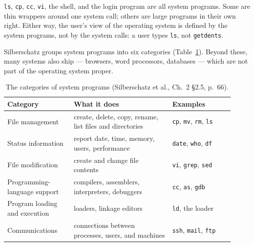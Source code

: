 \documentclass[11pt]{article}
\begin{document}
\texttt{ls}, \texttt{cp}, \texttt{cc}, \texttt{vi}, the shell, and the login
program are all system programs. Some are thin wrappers around one system
call; others are large programs in their own right. Either way, the user's view
of the operating system is defined by the system programs, not by the system
calls: a user types \texttt{ls}, not \texttt{getdents}.

Silberschatz groups system programs into six categories
(Table~\ref{tab:sysprog}). Beyond these, many systems also ship
 --- browsers, word processors, databases --- which
are not part of the operating system proper.

\begin{table}[h]
\centering
\small
\renewcommand{\arraystretch}{1.3}
\begin{tabular}{@{}>{\raggedright\arraybackslash}p{0.27\linewidth}>{\raggedright\arraybackslash}p{0.40\linewidth}>{\raggedright\arraybackslash}p{0.25\linewidth}@{}}
\toprule
\textbf{Category} & \textbf{What it does} & \textbf{Examples} \\
\midrule
File management & create, delete, copy, rename, list files and directories & \texttt{cp}, \texttt{mv}, \texttt{rm}, \texttt{ls} \\
Status information & report date, time, memory, users, performance & \texttt{date}, \texttt{who}, \texttt{df} \\
File modification & create and change file contents & \texttt{vi}, \texttt{grep}, \texttt{sed} \\
Programming-language support & compilers, assemblers, interpreters, debuggers & \texttt{cc}, \texttt{as}, \texttt{gdb} \\
Program loading and execution & loaders, linkage editors & \texttt{ld}, the loader \\
Communications & connections between processes, users, and machines & \texttt{ssh}, \texttt{mail}, \texttt{ftp} \\
\bottomrule
\end{tabular}
\caption{The categories of system programs (Silberschatz et al., Ch.~2 \S2.5,
p.~66).}
\label{tab:sysprog}
\end{table}
\end{document}
